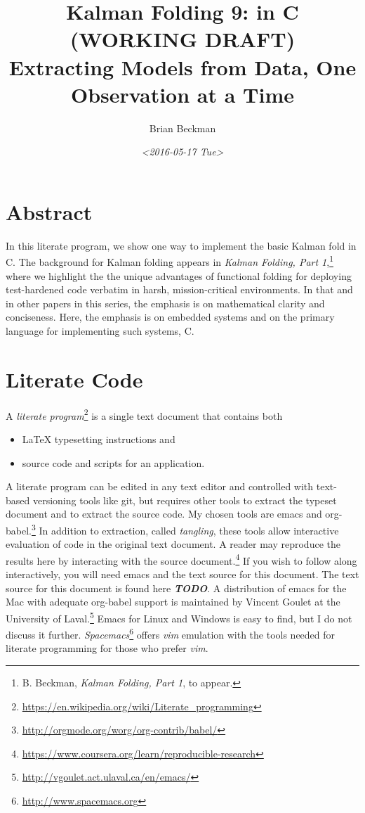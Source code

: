 \documentclass[10pt,oneside,x11names]{article}
\author{Brian Beckman}
\date{\textit{<2016-05-17 Tue>}}
\title{Kalman Folding 9: in C (WORKING DRAFT)\\\medskip
\large Extracting Models from Data, One Observation at a Time}
\begin{document}
\maketitle
\setcounter{tocdepth}{2}
\tableofcontents


\section{Abstract}
\label{sec:orgheadline1}

In this literate program, we show one way to implement the basic Kalman fold in
C. The background for Kalman folding appears in \emph{Kalman Folding, Part
1},\footnote{B. Beckman, \emph{Kalman Folding, Part 1}, to appear.} where we highlight the the unique advantages of functional folding
for deploying test-hardened code verbatim in harsh, mission-critical
environments. In that and in other papers in this series, the emphasis is on
mathematical clarity and conciseness. Here, the emphasis is on embedded systems
and on the primary language for implementing such systems, C.

\section{Literate Code}
\label{sec:orgheadline2}

A \emph{literate program}\footnote{\url{https://en.wikipedia.org/wiki/Literate_programming}} is a single text document that contains both
\begin{itemize}
\item \LaTeX{} typesetting instructions and
\item source code and scripts for an application.
\end{itemize}
A literate program can be edited in any text editor and controlled with
text-based versioning tools like git, but requires other tools to extract the
typeset document and to extract the source code. My chosen tools are emacs and
org-babel.\footnote{\url{http://orgmode.org/worg/org-contrib/babel/}} In addition to extraction, called \emph{tangling}, these tools
allow interactive evaluation of code in the original text document. A reader may
reproduce the results here by interacting with the source document.\footnote{\url{https://www.coursera.org/learn/reproducible-research}} If
you wish to follow along interactively, you will need emacs and the text source
for this document. The text source for this document is found here \textbf{\emph{TODO}}. A
distribution of emacs for the Mac with adequate org-babel support is maintained
by Vincent Goulet at the University of Laval.\footnote{\url{http://vgoulet.act.ulaval.ca/en/emacs/}} Emacs for Linux and
Windows is easy to find, but I do not discuss it further. \emph{Spacemacs}\footnote{\url{http://www.spacemacs.org}}
offers \emph{vim} emulation with the tools needed for literate programming for those
who prefer \emph{vim}.
\end{document}
